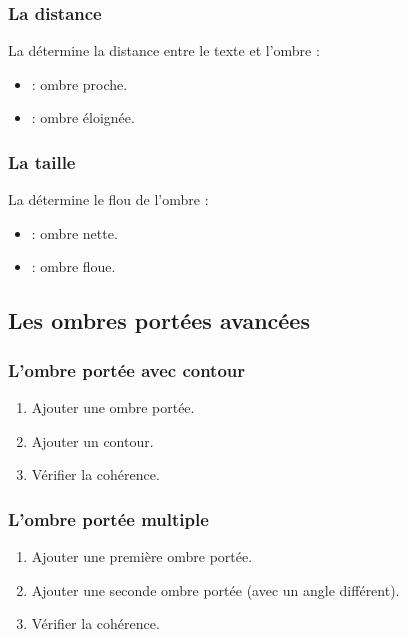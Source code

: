 \subsubsection{La distance}

La  détermine la distance entre le texte et l'ombre :

\begin{itemize}
    \item {} : ombre proche.
    \item {} : ombre éloignée.
\end{itemize}

\subsubsection{La taille}

La  détermine le flou de l'ombre :

\begin{itemize}
    \item {} : ombre nette.
    \item {} : ombre floue.
\end{itemize}

\subsection{Les ombres portées avancées}

\subsubsection{L'ombre portée avec contour}

\begin{enumerate}
    \item Ajouter une ombre portée.
    \item Ajouter un contour.
    \item Vérifier la cohérence.
\end{enumerate}

\subsubsection{L'ombre portée multiple}

\begin{enumerate}
    \item Ajouter une première ombre portée.
    \item Ajouter une seconde ombre portée (avec un angle différent).
    \item Vérifier la cohérence.
\end{enumerate}

